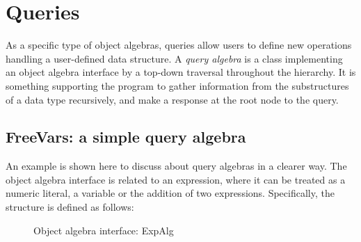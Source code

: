 \section{Queries}\label{sec:queries}

As a specific type of object algebras, queries allow users to define
new operations handling a user-defined data structure. A \textit{query
  algebra} is a class implementing an object algebra interface by a
top-down traversal throughout the hierarchy. It is something
supporting the program to gather information from the substructures of
a data type recursively, and make a response at the root node to the
query.
\begin{comment}
\bruno{Haoyuan: please stop using ``$\backslash\backslash$" after every paragraph!
A normal paragraph is created by having an empty line, not by using
``$\backslash\backslash$". The ``$\backslash\backslash$" command is only for forcing a new line.}
\end{comment}
\begin{comment}
Write a new definition. Class or interface?
\end{comment}

\subsection{FreeVars: a simple query algebra}\label{subsec:freevars}

An example is shown here to discuss about query algebras in a clearer
way. The object algebra interface is related to an expression, where
it can be treated as a numeric literal, a variable or the addition of
two expressions. Specifically, the structure is defined as follows:

\begin{figure}[!htbp]
\vspace{-.1in}
\caption{Object algebra interface: ExpAlg}
\label{exp_alg}
\end{figure}
\begin{comment}
\bruno{Don't copy the code! Use the code from the
  repository directly via the ruby script! The same applies to the
  other pieces of code in the rest of the paper.}
\end{comment}

